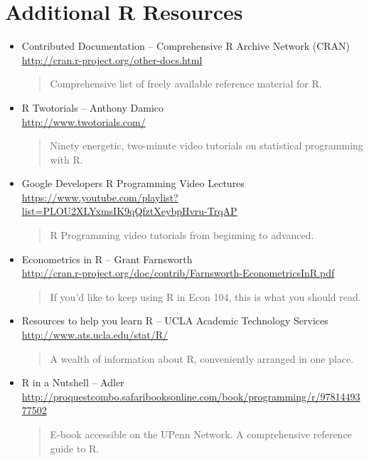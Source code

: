\documentclass[11pt, letterpaper]{article}
\begin{document}
\section*{Additional R Resources} 
\begin{itemize}
		       \item Contributed Documentation -- Comprehensive R Archive Network (CRAN) \\\url{http://cran.r-project.org/other-docs.html}
           	\begin{quote}
           		Comprehensive list of freely available reference material for R.
           	\end{quote}
\item R Twotorials -- Anthony Damico \\\url{http://www.twotorials.com/}
		\begin{quote}
		Ninety energetic, two-minute video tutorials on statistical programming with R. 
		\end{quote}
			\item Google Developers R Programming Video Lectures\\ \url{https://www.youtube.com/playlist?list=PLOU2XLYxmsIK9qQfztXeybpHvru-TrqAP}\begin{quote}R Programming video tutorials from beginning to advanced. \end{quote}
		 	\item Econometrics in R -- Grant Farnsworth\\\url{http://cran.r-project.org/doc/contrib/Farnsworth-EconometricsInR.pdf}
 		\begin{quote}
 		If you'd like to keep using R in Econ 104, this is what you should read.
 		\end{quote}
 			\item Resources to help you learn R -- UCLA Academic Technology Services \\\url{http://www.ats.ucla.edu/stat/R/}
		\begin{quote}
			A wealth of information about R, conveniently arranged in one place.
		\end{quote}
	           \item R in a Nutshell -- Adler\\ \url{http://proquestcombo.safaribooksonline.com/book/programming/r/9781449377502}         
           	\begin{quote}
           		E-book accessible on the UPenn Network. A comprehensive reference guide to R.
           	\end{quote}
\end{itemize}
\end{document}
